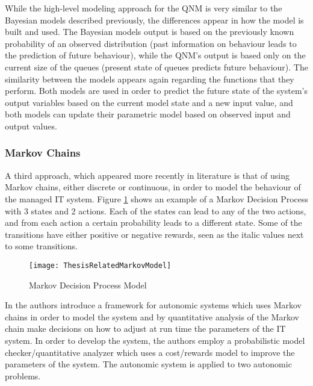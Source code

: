 While the high-level modeling approach for the QNM  is very similar to the Bayesian models described previously, the differences appear in how the model is built and used. The Bayesian models output is based on the previously known probability of an observed distribution (past information on behaviour leads to the prediction of future behaviour), while the QNM's output is based only on the current size of the queues (present state of queues predicts future behaviour). The similarity between the models appears again regarding the functions that they perform. Both models are used in order to predict the future state of the system's output variables based on the current model state and a new input value, and both models can update their parametric model based on observed input and output values.

\subsubsection{Markov Chains}

A third approach, which appeared more recently in literature is that of using Markov chains, either discrete or continuous, in order to model the behaviour of the managed IT system. Figure \ref{fig:markovmodel} shows an example of a Markov Decision Process with 3 states and 2 actions. Each of the states can lead to any of the two actions, and from each action a certain probability leads to a different state. Some of the transitions have either positive or negative rewards, seen as the italic values next to some transitions.

\begin{figure}
	\centering
		\texttt{[image: ThesisRelatedMarkovModel]}
	\caption{Markov Decision Process Model}
	\label{fig:markovmodel}
\end{figure}

In \cite{related:markov1} the authors introduce a framework for autonomic systems which uses Markov chains in order to model the system and by quantitative analysis of the Markov chain make decisions on how to adjust at run time the parameters of the IT system. In order to develop the system, the authors employ a probabilistic model checker/quantitative analyzer which uses a cost/rewards model to improve the parameters of the system. The autonomic system is applied to two autonomic problems. 

